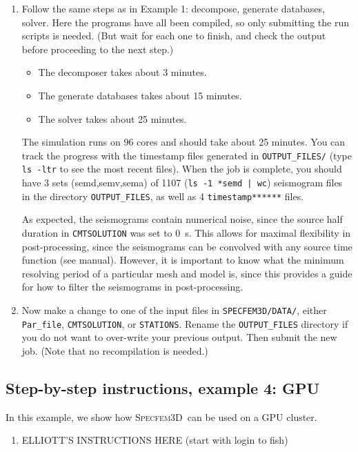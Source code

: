 \documentclass[10pt,fleqn,letterpaper]{article}
\newcommand{\specfem}{\textsc{Specfem3D}}
\begin{document}
\begin{enumerate}
\item Follow the same steps as in Example 1: decompose, generate databases, solver. Here the programs have all been compiled, so only submitting the run scripts is needed. (But wait for each one to finish, and check the output before proceeding to the next step.)
%
\begin{itemize}
\item The decomposer takes about 3 minutes.
\item The generate databases takes about 15 minutes.
\item The solver takes about 25 minutes.
\end{itemize}
%
The simulation runs on 96 cores and should take about 25 minutes. You can track the progress with the timestamp files generated in \verb+OUTPUT_FILES/+ (type \verb+ls -ltr+ to see the most recent files). When the job is complete, you should have 3 sets (semd,semv,sema) of 1107 (\verb+ls -1 *semd | wc+) seismogram files in the directory \verb+OUTPUT_FILES+, as well as 4 \verb+timestamp******+ files.

As expected, the seismograms contain numerical noise, since the source half duration in \verb+CMTSOLUTION+ was set to 0~s. This allows for maximal flexibility in post-processing, since the seismograms can be convolved with any source time function (see manual). However, it is important to know what the minimum resolving period of a particular mesh and model is, since this provides a guide for how to filter the seismograms in post-processing.

\item Now make a change to one of the input files in \verb+SPECFEM3D/DATA/+, either \verb+Par_file+, \verb+CMTSOLUTION+, or \verb+STATIONS+. Rename the \verb+OUTPUT_FILES+ directory if you do not want to over-write your previous output. Then submit the new job. (Note that no recompilation is needed.)

\end{enumerate}


\subsection*{Step-by-step instructions, example 4: GPU}

In this example, we show how \specfem\ can be used on a GPU cluster.

\begin{enumerate}
\item ELLIOTT'S INSTRUCTIONS HERE (start with login to fish)
\end{enumerate}


%
%

\end{document}

